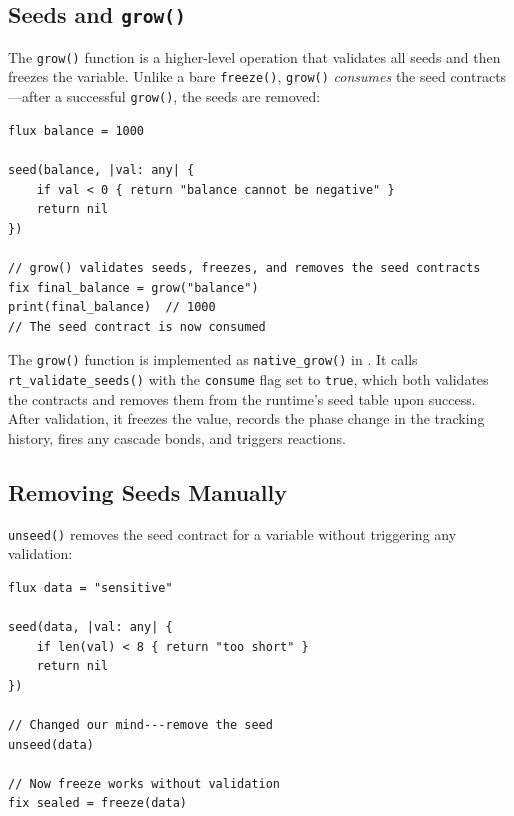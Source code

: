 \subsection{Seeds and \texttt{grow()}}


The \lstinline|grow()| function is a higher-level operation that validates all seeds and then freezes the variable.
Unlike a bare \lstinline|freeze()|, \lstinline|grow()| \emph{consumes} the seed contracts---after a successful \lstinline|grow()|, the seeds are removed:

\begin{lstlisting}[language=Lattice, caption={Using grow() with seeds}]
flux balance = 1000

seed(balance, |val: any| {
    if val < 0 { return "balance cannot be negative" }
    return nil
})

// grow() validates seeds, freezes, and removes the seed contracts
fix final_balance = grow("balance")
print(final_balance)  // 1000
// The seed contract is now consumed
\end{lstlisting}

The \lstinline|grow()| function is implemented as \lstinline|native_grow()| in .
It calls \lstinline|rt_validate_seeds()| with the \lstinline|consume| flag set to \lstinline|true|, which both validates the contracts and removes them from the runtime's seed table upon success.
After validation, it freezes the value, records the phase change in the tracking history, fires any cascade bonds, and triggers reactions.

\subsection{Removing Seeds Manually}

\lstinline|unseed()| removes the seed contract for a variable without triggering any validation:

\begin{lstlisting}[language=Lattice, caption={Removing a seed contract}]
flux data = "sensitive"

seed(data, |val: any| {
    if len(val) < 8 { return "too short" }
    return nil
})

// Changed our mind---remove the seed
unseed(data)

// Now freeze works without validation
fix sealed = freeze(data)
\end{lstlisting}

